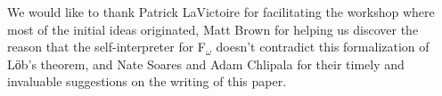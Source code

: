 \acks We would like to thank Patrick LaVictoire for facilitating the
workshop where most of the initial ideas originated, Matt Brown for
helping us discover the reason that the self-interpreter for
F$_\omega$ doesn't contradict this formalization of Lӧb's theorem, and
Nate Soares and Adam Chlipala for their timely and invaluable
suggestions on the writing of this paper.
